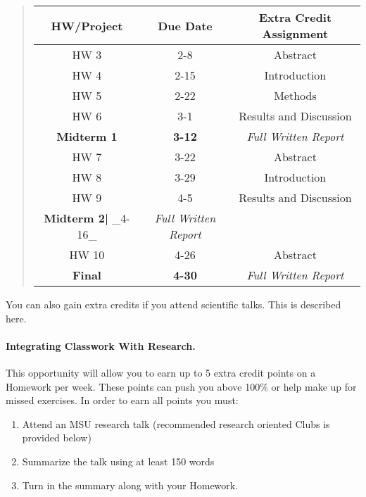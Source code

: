 \documentclass[%
oneside,                 %
final,                   %
10pt]{article}
\begin{document}
\begin{quote}
\begin{tabular}{ccc}
\hline
\multicolumn{1}{c}{ HW/Project } & \multicolumn{1}{c}{ Due Date } & \multicolumn{1}{c}{ Extra Credit Assignment } \\
\hline
HW 3                       & 2-8                        & Abstract                   \\
HW 4                       & 2-15                       & Introduction               \\
HW 5                       & 2-22                       & Methods                    \\
HW 6                       & 3-1                        & Results and Discussion     \\
\textbf{Midterm 1}         & \textbf{3-12}              & \emph{Full Written Report} \\
HW 7                       & 3-22                       & Abstract                   \\
HW 8                       & 3-29                       & Introduction               \\
HW 9                       & 4-5                        & Results and Discussion     \\
\textbf{Midterm 2|} _4-16_ & \emph{Full Written Report} \\
HW 10                      & 4-26                       & Abstract                   \\
\textbf{Final}             & \textbf{4-30}              & \emph{Full Written Report} \\
\hline
\end{tabular}
\end{quote}

\noindent

You can also gain extra credits if you attend scientific talks.
This is described here.


\paragraph{Integrating Classwork With Research.}
This opportunity will allow you to earn up to 5 extra credit points on a Homework per week. These points can push you above 100\% or help make up for missed exercises.
In order to earn all points you must:

\begin{enumerate}
\item Attend an MSU research talk (recommended research oriented Clubs is  provided below)

\item Summarize the talk using at least 150 words

\item Turn in the summary along with your Homework.
\end{enumerate}
\end{document}
